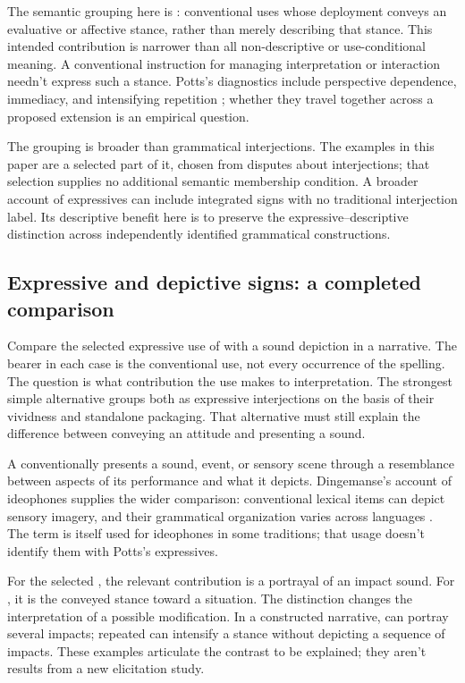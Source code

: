 The semantic grouping here is : conventional uses
whose deployment conveys an evaluative or affective stance, rather than
merely describing that stance. This intended contribution is narrower than
all non-descriptive or use-conditional meaning. A conventional instruction
for managing interpretation or interaction needn't express such a stance.
Potts's diagnostics include perspective dependence, immediacy, and
intensifying repetition \citep[166--167]{potts2007}; whether they travel
together across a proposed extension is an empirical question.

The grouping is broader than grammatical interjections. The examples in
this paper are a selected part of it, chosen from disputes about
interjections; that selection supplies no additional semantic membership
condition. A broader account of expressives can include integrated signs
with no traditional interjection label. Its descriptive benefit here is
to preserve the expressive--descriptive distinction across independently
identified grammatical constructions.

\subsection{Expressive and depictive signs: a completed comparison}\label{sec:expressive-depictive}

Compare the selected expressive use of  with a sound depiction
 in a narrative. The bearer in each case is the conventional
use, not every occurrence of the spelling. The question is what contribution
the use makes to interpretation. The strongest simple alternative groups
both as expressive interjections on the basis of their vividness and
standalone packaging. That alternative must still explain the difference
between conveying an attitude and presenting a sound.

A  conventionally presents a sound, event, or sensory
scene through a resemblance between aspects of its performance and what
it depicts. Dingemanse's account of ideophones supplies the wider comparison:
conventional lexical items can depict sensory imagery, and their grammatical
organization varies across languages \citep[2--3]{dingemanse2018}.
The term  is itself used for ideophones in some traditions;
that usage doesn't identify them with Potts's expressives.

For the selected , the relevant contribution is a portrayal
of an impact sound. For , it is the conveyed stance toward
a situation. The distinction changes the interpretation of a possible
modification. In a constructed narrative,  can
portray several impacts; repeated  can intensify a stance
without depicting a sequence of impacts. These examples articulate the
contrast to be explained; they aren't results from a new elicitation study.

